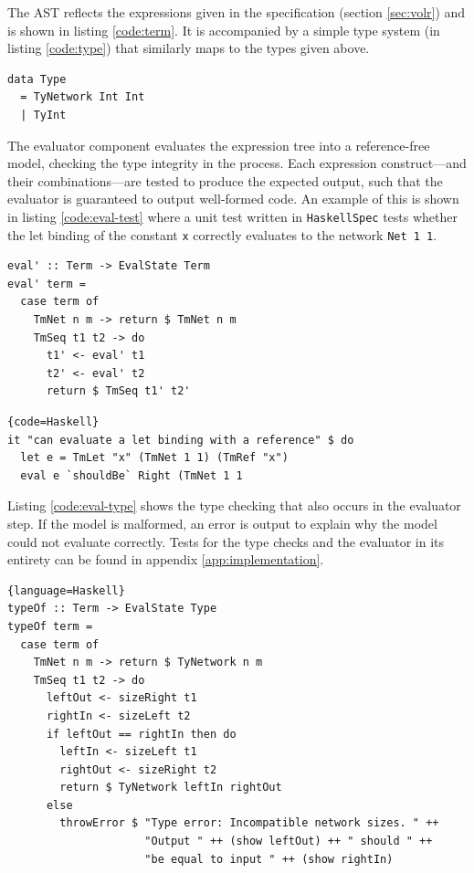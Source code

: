The AST reflects the expressions given in the 
specification (section \ref{sec:volr}) and is
shown in listing \ref{code:term}.
It is accompanied by a simple type system (in listing \ref{code:type})
that similarly maps to the types given above.

\lstset{caption=Volr type system in Haskell.}
\begin{lstlisting}
data Type 
  = TyNetwork Int Int
  | TyInt
\end{lstlisting} \label{code:type}

The evaluator component evaluates the expression tree into
a reference-free model, checking the type integrity in the
process.
Each expression construct---and their combinations---are
tested to produce the expected output, such that the evaluator
is guaranteed to output well-formed code.
An example of this is shown in listing \ref{code:eval-test}
where a unit test  written in \texttt{HaskellSpec} 
tests whether the let binding of the constant \texttt{x} correctly
evaluates to the network \texttt{Net 1 1}.

\lstset{caption=Part of the evaluation code in Haskell.}
\begin{lstlisting}
eval' :: Term -> EvalState Term
eval' term =
  case term of
    TmNet n m -> return $ TmNet n m
    TmSeq t1 t2 -> do
      t1' <- eval' t1 
      t2' <- eval' t2
      return $ TmSeq t1' t2'
\end{lstlisting} \label{code:evaluator}

\lstset{caption=A unit test for the correct evaluation of a let binding.}
\begin{lstlisting}{code=Haskell}
it "can evaluate a let binding with a reference" $ do
  let e = TmLet "x" (TmNet 1 1) (TmRef "x")
  eval e `shouldBe` Right (TmNet 1 1
\end{lstlisting} \label{code:eval-test}

Listing \ref{code:eval-type} shows the type checking
that also occurs in the evaluator step. 
If the model is malformed, an error is output to explain why the
model could not evaluate correctly.
Tests for the type checks and the evaluator in its entirety
can be found in appendix \ref{app:implementation}.

\lstset{caption=Part of the type checking code in Haskell.}
\begin{lstlisting}{language=Haskell}
typeOf :: Term -> EvalState Type
typeOf term = 
  case term of
    TmNet n m -> return $ TyNetwork n m
    TmSeq t1 t2 -> do
      leftOut <- sizeRight t1
      rightIn <- sizeLeft t2
      if leftOut == rightIn then do
        leftIn <- sizeLeft t1
        rightOut <- sizeRight t2
        return $ TyNetwork leftIn rightOut
      else
        throwError $ "Type error: Incompatible network sizes. " ++
                     "Output " ++ (show leftOut) ++ " should " ++
                     "be equal to input " ++ (show rightIn)
\end{lstlisting} \label{code:eval-type}

